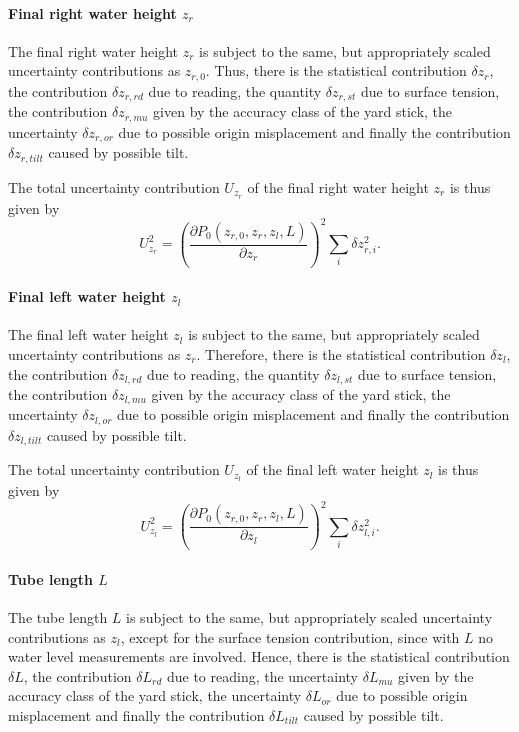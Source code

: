\documentclass[a4paper,11pt, twocolumn]{article}
\begin{document}
\paragraph{Final right water height $z_r$} The final right water height $z_r$ is subject to the same, but appropriately scaled uncertainty contributions as $z_{r,0}$. Thus, there is the statistical contribution $\delta z_r$, the contribution $\delta z_{r,rd}$ due to reading, the quantity $\delta z_{r,st}$ due to surface tension, the contribution $\delta z_{r,mu}$ given by the accuracy class of the yard stick, the uncertainty $\delta z_{r,or}$ due to possible origin misplacement and finally the contribution $\delta z_{r,tilt}$ caused by possible tilt.

The total uncertainty contribution $U_{z_{r}}$ of the final right water height $z_{r}$ is thus given by \begin{equation}
	U_{z_{r}}^2 = \left(\frac{\partial P_0(z_{r,0}, z_r, z_l, L)}{\partial z_{r}}\right)^2\sum_{i}\delta z_{r,i}^2.
\end{equation}

\paragraph{Final left water height $z_l$} The final left water height $z_l$ is subject to the same, but appropriately scaled uncertainty contributions as $z_{r}$. Therefore, there is the statistical contribution $\delta z_l$, the contribution $\delta z_{l,rd}$ due to reading, the quantity $\delta z_{l,st}$ due to surface tension, the contribution $\delta z_{l,mu}$ given by the accuracy class of the yard stick, the uncertainty $\delta z_{l,or}$ due to possible origin misplacement and finally the contribution $\delta z_{l,tilt}$ caused by possible tilt.

The total uncertainty contribution $U_{z_{l}}$ of the final left water height $z_{l}$ is thus given by \begin{equation}
	U_{z_{l}}^2 = \left(\frac{\partial P_0(z_{r,0}, z_r, z_l, L)}{\partial z_{l}}\right)^2\sum_{i}\delta z_{l,i}^2.
\end{equation}

\paragraph{Tube length $L$} The tube length $L$ is subject to the same, but appropriately scaled uncertainty contributions as $z_{l}$, except for the surface tension contribution, since with $L$ no water level measurements are involved. Hence, there is the statistical contribution $\delta L$, the contribution $\delta L_{rd}$ due to reading, the uncertainty $\delta L_{mu}$ given by the accuracy class of the yard stick, the uncertainty $\delta L_{or}$ due to possible origin misplacement and finally the contribution $\delta L_{tilt}$ caused by possible tilt.
\end{document}
